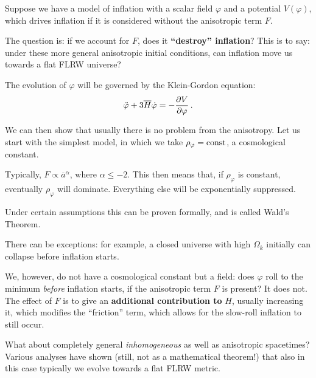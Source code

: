 \documentclass[main.tex]{subfiles}
\begin{document}
Suppose we have a model of inflation with a scalar field \(\varphi \) and a potential \(V(\varphi )\), which drives inflation if it is considered without the anisotropic term \(F\). 

The question is: if we account for \(F\), does it \textbf{``destroy'' inflation}? 
This is to say: under these more general anisotropic initial conditions, can inflation move us towards a flat FLRW universe? 

The evolution of \(\varphi \) will be governed by the Klein-Gordon equation:
%
\begin{align}
\ddot{\varphi} + 3 \overline{H} \dot{\varphi} = - \pdv{V}{\varphi }
\,.
\end{align}

We can then show that usually there is no problem from the anisotropy. 
Let us start with the simplest model, in which we take \(\rho _\varphi = \text{const}\), a cosmological constant. 

Typically, \(F \propto \overline{a}^{\alpha }\), where \(\alpha \leq -2\). This then means that, if \(\rho _\varphi \) is constant, eventually \(\rho _\varphi \) will dominate. 
Everything else will be exponentially suppressed. 

Under certain assumptions this can be proven formally, and is called Wald's Theorem. 

There can be exceptions: for example, a closed universe with high \(\Omega _k\) initially can collapse before inflation starts. 

We, however, do not have a cosmological constant but a field: does \(\varphi \) roll to the minimum \emph{before} inflation starts, if the anisotropic term \(F\) is present?
It does not. The effect of \(F\) is to give an \textbf{additional contribution to} \(H\), usually increasing it, which modifies the ``friction'' term, which allows for the slow-roll inflation to still occur.

What about completely general \emph{inhomogeneous} as well as anisotropic spacetimes? 
Various analyses have shown (still, not as a mathematical theorem!) that also in this case typically we evolve towards a flat FLRW metric.
\end{document}

